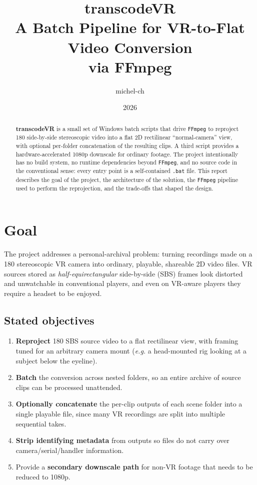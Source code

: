 \documentclass[11pt,a4paper]{article}
\title{
  \vspace{-1.5cm}
  \textbf{transcodeVR} \\[0.3em]
  \large A Batch Pipeline for VR-to-Flat Video Conversion \\
  \large via FFmpeg
}
\author{michel-ch}
\date{2026}
\begin{document}
\maketitle
\thispagestyle{empty}

\vspace{0.5cm}
\begin{abstract}
\noindent
\textbf{transcodeVR} is a small set of Windows batch scripts that drive
\texttt{FFmpeg} to reproject 180\textdegree{} side-by-side stereoscopic
video into a flat 2D rectilinear ``normal-camera'' view, with optional
per-folder concatenation of the resulting clips. A third script provides
a hardware-accelerated 1080p downscale for ordinary footage. The project
intentionally has no build system, no runtime dependencies beyond
\texttt{FFmpeg}, and no source code in the conventional sense: every entry
point is a self-contained \texttt{.bat} file. This report describes the
goal of the project, the architecture of the solution, the
\texttt{FFmpeg} pipeline used to perform the reprojection, and the
trade-offs that shaped the design.
\end{abstract}

\tableofcontents
\newpage

\section{Goal}

The project addresses a personal-archival problem: turning recordings
made on a 180\textdegree{} stereoscopic VR camera into ordinary,
playable, shareable 2D video files. VR sources stored as
\emph{half-equirectangular} side-by-side (SBS) frames look distorted
and unwatchable in conventional players, and even on VR-aware players
they require a headset to be enjoyed.

\subsection{Stated objectives}
\begin{enumerate}[leftmargin=1.5em, itemsep=0.2em]
  \item \textbf{Reproject} 180\textdegree{} SBS source video to a flat
        rectilinear view, with framing tuned for an arbitrary
        camera mount (\textit{e.g.} a head-mounted rig looking at a
        subject below the eyeline).
  \item \textbf{Batch} the conversion across nested folders, so an
        entire archive of source clips can be processed unattended.
  \item \textbf{Optionally concatenate} the per-clip outputs of each
        scene folder into a single playable file, since many VR
        recordings are split into multiple sequential takes.
  \item \textbf{Strip identifying metadata} from outputs so files do not
        carry over camera/serial/handler information.
  \item Provide a \textbf{secondary downscale path} for non-VR footage
        that needs to be reduced to 1080p.
\end{enumerate}
\end{document}
